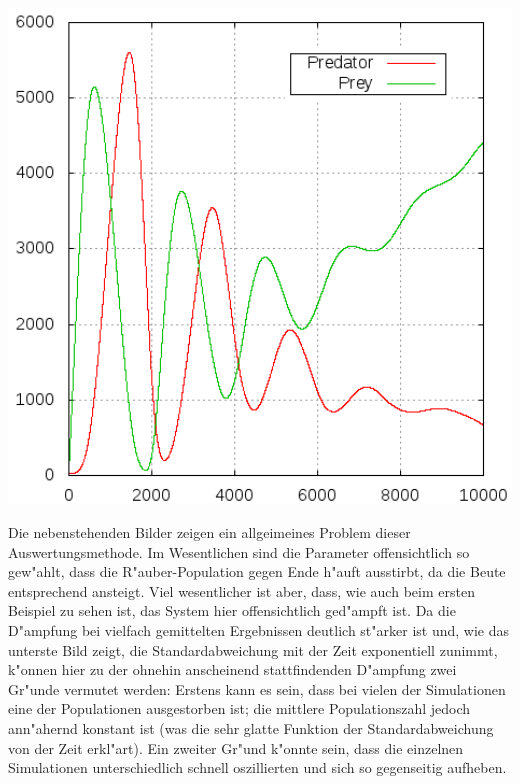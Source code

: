 \documentclass[11pt]{article}
\begin{document}
\begin{minipage}[b]{0.58\textwidth}
\includegraphics[width=1.0\textwidth]{Graphiken/ppm45pop.png}
\end{minipage}
\begin{minipage}[b]{0.39\textwidth}
Die nebenstehenden Bilder zeigen ein allgeimeines Problem dieser Auswertungsmethode. Im Wesentlichen sind die Parameter offensichtlich so gew"ahlt, dass die R"auber-Population gegen Ende h"auft ausstirbt, da die Beute entsprechend ansteigt. Viel wesentlicher ist aber, dass, wie auch beim ersten Beispiel zu sehen ist, das System hier offensichtlich ged"ampft ist. Da die D"ampfung bei vielfach gemittelten Ergebnissen deutlich st"arker ist und, wie das unterste Bild zeigt, die Standardabweichung mit der Zeit exponentiell zunimmt, k"onnen hier zu der ohnehin anscheinend stattfindenden D"ampfung zwei Gr"unde vermutet werden: Erstens kann es sein, dass bei vielen der Simulationen eine der Populationen ausgestorben ist; die mittlere Populationszahl jedoch ann"ahernd konstant ist (was die sehr glatte Funktion der Standardabweichung von der Zeit erkl"art). Ein zweiter Gr"und k"onnte sein, dass die einzelnen Simulationen unterschiedlich schnell oszillierten und sich so gegenseitig aufheben.
\end{minipage}
\end{document}
